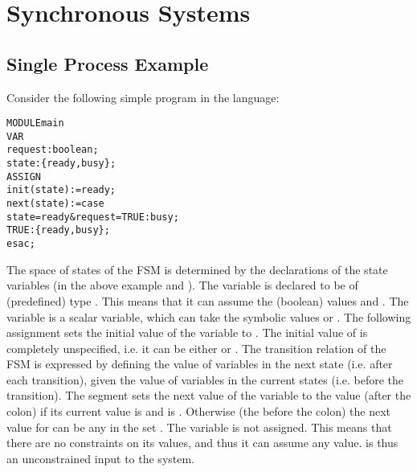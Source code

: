 \section{Synchronous Systems}
\label{Synchronous Systems}

\subsection{Single Process Example}
\label{Mutual Exclusion Example}

Consider the following simple program in the \nusmv language:
\noindent
\begin{alltt}
MODULE main
VAR
  request : boolean;
  state   : \{ready, busy\};
ASSIGN
  init(state) := ready;
  next(state) := case
                   state = ready & request = TRUE : busy;
                   TRUE                        : \{ready, busy\};
                 esac;
\end{alltt}

The space of states of the
FSM is determined by the declarations of the state
variables (in the above example  and ). The
variable  is declared to be of (predefined) type
.  This means that it can assume the (boolean) values
 and . The variable  is a scalar variable,
which can take the symbolic values  or .  The
following assignment sets the initial value of the variable
 to . The initial value of  is
completely unspecified, i.e. it can be either 
or .  The transition relation of the FSM is expressed by
defining the value of variables in the next state (i.e. after each
transition), given the value of variables in the current states
(i.e. before the transition). The  segment sets the next
value of the variable
 to the value  (after the colon) if its current
value is  and  is .  Otherwise
(the  before the colon) the next value for
 can be any in the set .
The variable  is not assigned. This means that there are
no constraints on its values, and thus it can assume any value.
 is thus an unconstrained input to the system.



